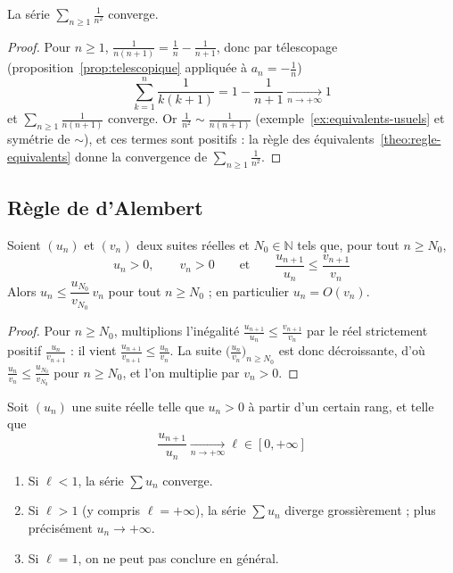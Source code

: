 \begin{exemple}
\label{ex:serie-1-sur-n2}
La série $\sum_{n\geq1}\frac{1}{n^2}$ converge.
\end{exemple}

\begin{proof}
Pour $n\geq 1$, $\frac{1}{n(n+1)}=\frac1n-\frac{1}{n+1}$, donc par télescopage (proposition~\ref{prop:telescopique} appliquée à $a_n=-\frac1n$)
\[\sum_{k=1}^{n}\frac{1}{k(k+1)}=1-\frac{1}{n+1}\xrightarrow[n\to+\infty]{}1\]
et $\sum_{n\geq1}\frac{1}{n(n+1)}$ converge. Or $\frac{1}{n^2}\sim\frac{1}{n(n+1)}$ (exemple~\ref{ex:equivalents-usuels} et symétrie de $\sim$), et ces termes sont positifs : la règle des équivalents~\ref{theo:regle-equivalents} donne la convergence de $\sum_{n\geq1}\frac{1}{n^2}$.
\end{proof}

\subsection{Règle de d'Alembert}

\begin{lemme}
\label{lemme:comparaison-log}
Soient $(u_n)$ et $(v_n)$ deux suites réelles et $N_0\in\mathbb{N}$ tels que, pour tout $n\geq N_0$,
\[u_n>0,\qquad v_n>0\qquad\text{et}\qquad\frac{u_{n+1}}{u_n}\leq\frac{v_{n+1}}{v_n}\]
Alors $u_n\leq\dfrac{u_{N_0}}{v_{N_0}}\,v_n$ pour tout $n\geq N_0$ ; en particulier $u_n=O(v_n)$.
\end{lemme}

\begin{proof}
Pour $n\geq N_0$, multiplions l'inégalité $\frac{u_{n+1}}{u_n}\leq\frac{v_{n+1}}{v_n}$ par le réel strictement positif $\frac{u_n}{v_{n+1}}$ : il vient $\frac{u_{n+1}}{v_{n+1}}\leq\frac{u_n}{v_n}$. La suite $\big(\frac{u_n}{v_n}\big)_{n\geq N_0}$ est donc décroissante, d'où $\frac{u_n}{v_n}\leq\frac{u_{N_0}}{v_{N_0}}$ pour $n\geq N_0$, et l'on multiplie par $v_n>0$.
\end{proof}

\begin{theo}
\label{theo:dalembert}
Soit $(u_n)$ une suite réelle telle que $u_n>0$ à partir d'un certain rang, et telle que
\[\frac{u_{n+1}}{u_n}\xrightarrow[n\to+\infty]{}\ell\in[0,+\infty]\]
\begin{enumerate}
\item Si $\ell<1$, la série $\sum u_n$ converge.
\item Si $\ell>1$ (y compris $\ell=+\infty$), la série $\sum u_n$ diverge grossièrement ; plus précisément $u_n\to+\infty$.
\item Si $\ell=1$, on ne peut pas conclure en général.
\end{enumerate}
\end{theo}

